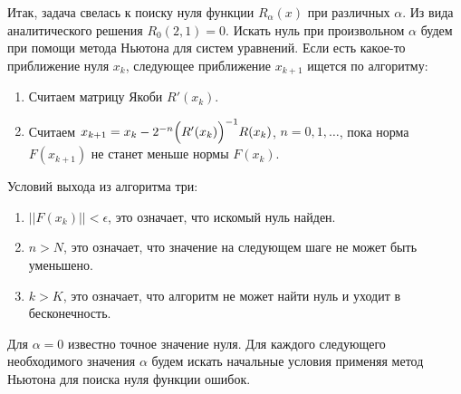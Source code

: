 \documentclass{article}
\begin{document}
Итак, задача свелась к поиску нуля функции $R_{\alpha}(x)$ при различных
$\alpha$. Из вида аналитического решения $R_{0}(2,1) = 0$.
Искать нуль при произвольном $\alpha$ будем при помощи метода
Ньютона для систем уравнений. Если есть какое-то приближение нуля $x_{k}$,
следующее приближение $x_{k+1}$ ищется по алгоритму:
\begin{enumerate}
  \item Считаем матрицу Якоби $R'(x_{k})$.
  \item Считаем $x_{k+1} = x_{k} - 2^{-n}\Bigl(R'(x_{k})\Bigr)^{-1}R(x_{k})$,
    $n = 0,1,\ldots$, пока норма $F(x_{k+1})$ не станет меньше нормы $F(x_{k})$.
\end{enumerate}
Условий выхода из алгоритма три:
\begin{enumerate}
  \item $||F(x_{k})|| < \epsilon$, это означает, что искомый нуль найден.
  \item $n > N$, это означает, что значение на следующем шаге не
    может быть уменьшено.
  \item $k > K$, это означает, что алгоритм не может найти нуль и
    уходит в бесконечность.
\end{enumerate}

Для $\alpha = 0$ известно точное значение нуля. Для каждого
следующего необходимого значения $\alpha$ будем
искать начальные условия применяя метод Ньютона для поиска нуля функции ошибок.
\end{document}
